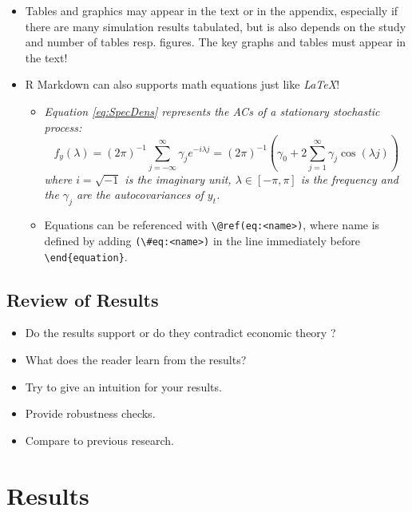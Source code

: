 \documentclass[11pt, a4paper, twosided]{book}
\begin{document}
\begin{itemize}
\item
  Tables and graphics may appear in the text or in the appendix, especially if
  there are many simulation results tabulated, but is also depends on the study
  and number of tables resp. figures. The key graphs and tables must appear in
  the text!
\item
  R Markdown can also supports math equations just like \emph{LaTeX}!
  \begin{itemize}
  \item
    \emph{Equation \eqref{eq:SpecDens} represents the ACs of a stationary
    stochastic process:}
    \begin{equation}
            f_y(\lambda) = (2\pi)^{-1} \sum_{j=-\infty}^{\infty}
                           \gamma_j e^{-i\lambda j}
                         =(2\pi)^{-1}\left(\gamma_0 + 2 \sum_{j=1}^{\infty}
        \gamma_j \cos(\lambda j)\right)
                                       \label{eq:SpecDens}
    \end{equation}
    \emph{where \(i=\sqrt{-1}\) is the imaginary unit, \(\lambda \in [-\pi, \pi]\) is the
    frequency and the \(\gamma_j\) are the autocovariances of \(y_t\).}
  \item
    Equations can be referenced with \texttt{\textbackslash{}@ref(eq:\textless{}name\textgreater{})}, where name is defined
    by adding \texttt{(\textbackslash{}\#eq:\textless{}name\textgreater{})} in the line immediately before \texttt{\textbackslash{}end\{equation\}}.
  \end{itemize}
\end{itemize}
\hypertarget{review-of-results}{%
\section{Review of Results}\label{review-of-results}}
\begin{itemize}
\item
  Do the results support or do they contradict economic theory ?
\item
  What does the reader learn from the results?
\item
  Try to give an intuition for your results.
\item
  Provide robustness checks.
\item
  Compare to previous research.
\end{itemize}
\hypertarget{results-1}{%
\chapter{Results}\label{results-1}}
\end{document}
